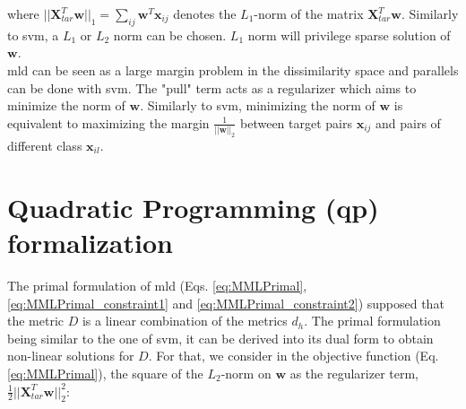 \noindent where $||\textbf{X}_{tar}^T \textbf{w}||_1=\sum_{ij} \textbf{w}^T \textbf{x}_{ij}$ denotes the $L_1$-norm of the matrix $\textbf{X}_{tar}^T \textbf{w}$. Similarly to {\sc svm}, a $L_1$ or $L_2$ norm can be chosen. $L_1$ norm will privilege sparse solution of $\textbf{w}$. \\
{\sc mld} can be seen as a large margin problem in the dissimilarity space and parallels can be done with {\sc svm}. The "pull" term acts as a regularizer which aims to minimize the norm of $\textbf{w}$. Similarly to {\sc svm}, minimizing the norm of $\textbf{w}$ is equivalent to maximizing the margin $\frac{1}{||\textbf{w}||_2}$ between target pairs $\textbf{x}_{ij}$ and pairs of different class $\textbf{x}_{il}$. 

\section{Quadratic Programming ({\sc qp}) formalization}
The primal formulation of {\sc mld} (Eqs. \ref{eq:MMLPrimal}, \ref{eq:MMLPrimal_constraint1} and \ref{eq:MMLPrimal_constraint2}) supposed that the metric $D$ is a linear combination of the metrics $d_h$. The primal formulation being similar to the one of {\sc svm}, it can be derived into its dual form to obtain non-linear solutions for $D$.
For that, we consider in the objective function (Eq. \ref{eq:MMLPrimal}), the square of the $L_2$-norm on $\textbf{w}$ as the regularizer term, $\frac{1}{2}||\textbf{X}_{tar}^T \textbf{w}||_2^2$:

